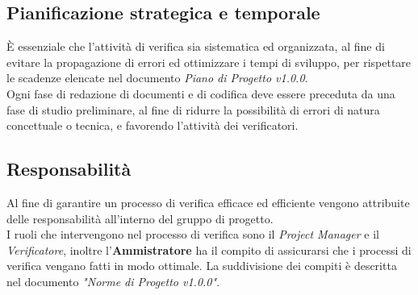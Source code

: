 \documentclass[12pt,a4paper,titlepage]{article}
\begin{document}
	\subsection{Pianificazione strategica e temporale}
	È essenziale che l'attività di verifica sia sistematica ed organizzata, al fine di evitare la propagazione di errori ed ottimizzare i tempi di sviluppo, per rispettare le scadenze elencate nel documento \textit{Piano di Progetto v1.0.0}.\\
	Ogni fase di redazione di documenti e di codifica deve essere preceduta da una fase di studio preliminare, al fine di ridurre la possibilità di errori di natura concettuale o tecnica, e favorendo l'attività dei verificatori.\\
	
	\subsection{Responsabilità}
	Al fine di garantire un processo di verifica efficace ed efficiente vengono attribuite delle responsabilità all'interno del gruppo di progetto.\\
	I ruoli che intervengono nel processo di verifica sono il \textit{Project Manager} e il \textit{Verificatore}, inoltre l'\textbf{Ammistratore} ha il compito di assicurarsi che i processi di verifica vengano fatti in modo ottimale. La suddivisione dei compiti è descritta nel documento \textit{"Norme di Progetto v1.0.0"}.
	
\end{document}

